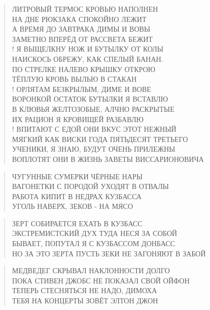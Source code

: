 \poemtitle{***}
\begin{verse}
ЛИТРОВЫЙ ТЕРМОС КРОВЬЮ НАПОЛНЕН\\
НА ДНЕ РЮКЗАКА СПОКОЙНО ЛЕЖИТ\\
А ВРЕМЯ ДО ЗАВТРАКА ДИМЫ И ВОВЫ\\
ЗАМЕТНО ВПЕРЁД ОТ РАССВЕТА БЕЖИТ\\!
Я ВЫЩЕЛКНУ НОЖ И БУТЫЛКУ ОТ КОЛЫ\\
НАИСКОСЬ ОБРЕЖУ, КАК СПЕЛЫЙ БАНАН.\\
ПО СТРЕЛКЕ НАЛЕВО КРЫШКУ ОТКРОЮ\\
ТЁПЛУЮ КРОВЬ ВЫЛЬЮ В СТАКАН\\!
ОРЛЯТАМ БЕЗКРЫЛЫМ, ДИМЕ И ВОВЕ\\
ВОРОНКОЙ ОСТАТОК БУТЫЛКИ Я ВСТАВЛЮ\\
В КЛЮВЬЯ ЖЕЛТОЗОБЫЕ, АЛЧНО РАСКРЫТЫЕ\\
ИХ РАЦИОН Я КРОВИЩЕЙ РАЗБАВЛЮ\\!
ВПИТАЮТ С ЕДОЙ ОНИ ВКУС ЭТОТ НЕЖНЫЙ\\
МЯГКИЙ КАК ВИСКИ ГОДА ПЯТЬДЕСЯТ ТРЕТЬЕГО\\
УЧЕНИКИ, Я ЗНАЮ, БУДУТ ОЧЕНЬ ПРИЛЕЖНЫ\\
ВОПЛОТЯТ ОНИ В ЖИЗНЬ ЗАВЕТЫ ВИССАРИОНОВИЧА
\end{verse}

\poemtitle{***}
\begin{verse}
ЧУГУННЫЕ СУМЕРКИ ЧЁРНЫЕ НАРЫ\\
ВАГОНЕТКИ С ПОРОДОЙ УХОДЯТ В ОТВАЛЫ\\
РАБОТА КИПИТ В НЕДРАХ КУЗБАССА\\
УГОЛЬ НАВЕРХ, ЗЕКОВ - НА МЯСО
\end{verse}

\poemtitle{***}
\begin{verse}
ЗЕРТ СОБИРАЕТСЯ ЕХАТЬ В КУЗБАСС\\
ЭКСТРЕМИСТСКИЙ ДУХ ТУДА НЕСЯ ЗА СОБОЙ\\
БЫВАЕТ, ПОПУТАЛ Я С КУЗБАССОМ ДОНБАСС\\
НО ЗА ЭТО ЗЕРТА ПУСТЬ ЗЕКИ НЕ ЗАГОНЯЮТ В ЗАБОЙ
\end{verse}

\poemtitle{***}
\begin{verse}
МЕДВЕДЕГ СКРЫВАЛ НАКЛОННОСТИ ДОЛГО\\
ПОКА СТИВЕН ДЖОБС НЕ ПОКАЗАЛ СВОЙ ОЙФОН\\
ТЕПЕРЬ СТЕСНЯТЬСЯ НЕ НАДО, ДИМОХА\\
ТЕБЯ НА КОНЦЕРТЫ ЗОВЁТ ЭЛТОН ДЖОН
\end{verse}


